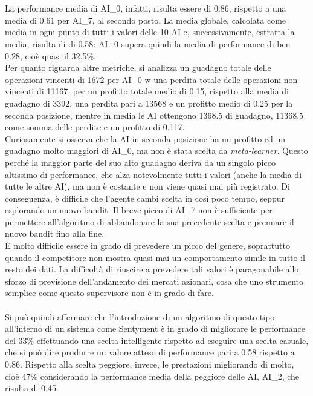 \documentclass[a4paper,12pt]{report}
\begin{document}
\begin{fig}
\\~\\La performance media di AI\_0, infatti, risulta essere di 0.86, rispetto a una media di 0.61 per AI\_7, al secondo posto. La media globale, calcolata come media in ogni punto di tutti i valori delle 10 AI e, successivamente, estratta la media, risulta di di 0.58: AI\_0 supera quindi la media di performance di ben 0.28, cioè quasi il 32.5\%.\\Per quanto riguarda altre metriche, si analizza un guadagno totale delle operazioni vincenti di 1672 per AI\_0 w una perdita totale delle operazioni non vincenti di 11167, per un profitto totale medio di 0.15, rispetto alla media di guadagno di 3392, una perdita pari a 13568 e un profitto medio di 0.25 per la seconda posizione, mentre in media le AI ottengono 1368.5 di guadagno, 11368.5 come somma delle perdite e un profitto di 0.117.\\ Curiosamente si osserva che la AI in seconda posizione ha un profitto ed un guadagno molto maggiori di AI\_0, ma non è stata scelta da \textit{meta-learner}. Questo perché la maggior parte del suo alto guadagno deriva da un singolo picco altissimo di performance, che alza notevolmente tutti i valori (anche la media di tutte le altre AI), ma non è costante e non viene quasi mai più registrato. Di conseguenza, è difficile che l'agente cambi scelta in così poco tempo, seppur esplorando un nuovo bandit. Il breve picco di AI\_7 non è sufficiente per permettere all'algoritmo di abbandonare la sua precedente scelta e premiare il nuovo bandit fino alla fine.\\È molto difficile essere in grado di prevedere un picco del genere, soprattutto quando il competitore non mostra quasi mai un comportamento simile in tutto il resto dei dati. La difficoltà di riuscire a prevedere tali valori è paragonabile allo sforzo di previsione dell'andamento dei mercati azionari, cosa che uno strumento semplice come questo supervisore non è in grado di fare.
\\~\\ Si può quindi affermare che l'introduzione di un algoritmo di questo tipo all'interno di un sistema come Sentyment è in grado di migliorare le performance del 33\% effettuando una scelta intelligente rispetto ad eseguire una scelta casuale, che si può dire produrre un valore atteso di performance pari a 0.58 rispetto a 0.86. Rispetto alla scelta peggiore, invece, le prestazioni migliorando di molto, cioè 47\% considerando la performance media della peggiore delle AI, AI\_2, che risulta di 0.45.


\end{fig}
\end{document}
